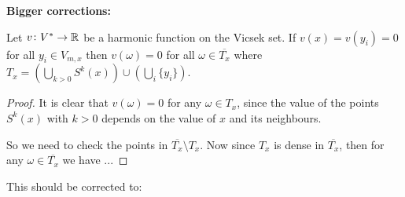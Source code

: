 \vspace{1em}
\noi \textbf{\Large Bigger corrections:}
\begin{center}
	\setcounter{chapter}{2}
	\setcounter{theorem}{13}
\begin{lemma}
		Let $v\colon V^{*} \to \mathbb{R}$ be a harmonic function on the Vicsek set. If $v(x) = v(y_i) = 0$ for all $y_i \in V_{m,x}$ then $v(\omega) = 0$ for all $\omega \in \overline{T_x}$ where $T_x = \left( \bigcup_{k > 0} S^{k}(x) \right) \cup \left(\bigcup_{i} \{y_i\} \right)$.
\end{lemma}
\begin{proof}
	It is clear that $v(\omega) = 0$ for any $\omega \in T_x$, since the value of the points $S^{k}(x)$ with $k > 0$ depends on the value of $x$ and its neighbours. 
	
	So we need to check the points in $\overline{T_x} \setminus T_x$. Now since $T_x$ is dense in $\overline{T_x}$, then for any $\omega \in \overline{T_x}$ we have ...  
\end{proof}
\end{center}
This should be corrected to:

